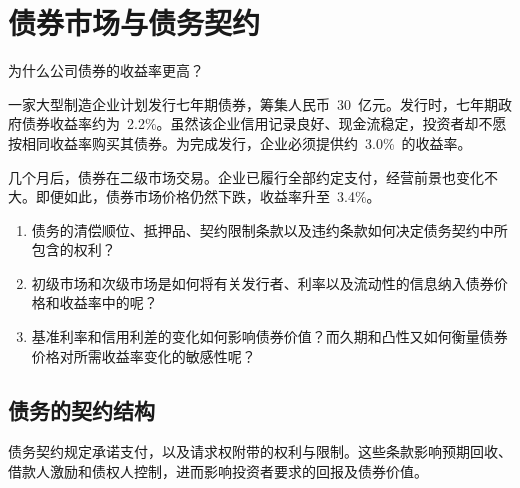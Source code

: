 \chapter{债券市场与债务契约}
\label{chap:Bond_Markets_and_Debt_Contracts}

\begin{openingcase}{为什么公司债券的收益率更高？}

一家大型制造企业计划发行七年期债券，筹集人民币~30~亿元。发行时，七年期政府债券收益率约为~2.2\%。虽然该企业信用记录良好、现金流稳定，投资者却不愿按相同收益率购买其债券。为完成发行，企业必须提供约~3.0\%~的收益率。

几个月后，债券在二级市场交易。企业已履行全部约定支付，经营前景也变化不大。即便如此，债券市场价格仍然下跌，收益率升至~3.4\%。

\end{openingcase}


\begin{tcolorbox}[
  enhanced,
  colback=FinanceBlue!6,
  colframe=FinanceBlue,
  boxrule=0.6pt,
  sharp corners,
  left=8pt,
  right=8pt,
  top=7pt,
  bottom=7pt,
  before skip=1em,
  after skip=1.6em,
  title=\textbf{核心问题},
  coltitle=white,
  colbacktitle=FinanceBlue,
  fonttitle=\bfseries,
  attach boxed title to top left={xshift=6pt,yshift=-2mm},
  boxed title style={
    boxrule=0pt,
    sharp corners,
    left=5pt,
    right=5pt,
    top=2pt,
    bottom=2pt
  }
]
\begin{enumerate}[
  leftmargin=*,
  label=\textcolor{FinanceBlue}{\textbf{\arabic*.}},
  itemsep=0.55em,
  topsep=0.2em
]

\item 债务的清偿顺位、抵押品、契约限制条款以及违约条款如何决定债务契约中所包含的权利？

\item 初级市场和次级市场是如何将有关发行者、利率以及流动性的信息纳入债券价格和收益率中的呢？

\item 基准利率和信用利差的变化如何影响债券价值？而久期和凸性又如何衡量债券价格对所需收益率变化的敏感性呢？

\end{enumerate}
\end{tcolorbox}

\section{债务的契约结构}

债务契约规定承诺支付，以及请求权附带的权利与限制。这些条款影响预期回收、借款人激励和债权人控制，进而影响投资者要求的回报及债券价值。

